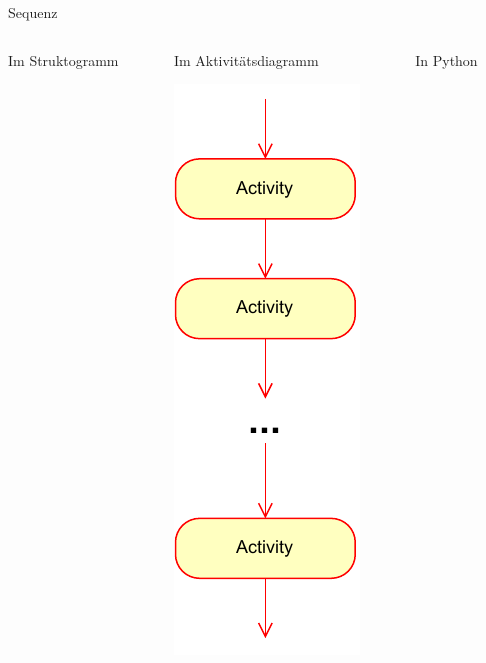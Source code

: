 \documentclass[xelatex,aspectratio=169]{beamer}
\begin{document}
\begin{frame}{Sequenz}
\begin{columns}[t]
\begin{column}{.3\linewidth}
\begin{block}{Im Struktogramm}
\begin{minipage}[c][.7\textheight][c]{\textwidth}
        \end{minipage}
      \end{block}
    \end{column}
    \begin{column}{.3\linewidth}
      \begin{block}{Im Aktivitätsdiagramm}
        \begin{minipage}[c][.7\textheight][c]{\textwidth}
          \centering
          \includegraphics[height=.7\textheight]{fig/algorithmus_sequenz_aktivitaetsdiagram.drawio.pdf}
        \end{minipage}
      \end{block}

    \end{column}
    \begin{column}{.4\linewidth}
      \begin{block}{In Python}
        \begin{minipage}[c][.7\textheight][c]{\textwidth}
          \inputminted{python}{src/algorithmus_sequenz.py}
        \end{minipage}
      \end{block}

    \end{column}
  \end{columns}

\end{frame}
\end{document}
